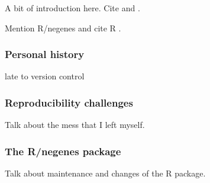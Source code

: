 A bit of introduction here. Cite \citet{lamichhane2003}
and \citet{blades2002}.

Mention R/negenes \citep{negenes} and cite R \citep{R}.

\subsubsection{Personal history}

late to version control

\subsubsection{Reproducibility challenges}

Talk about the mess that I left myself.

\subsubsection{The R/negenes package}

Talk about maintenance and changes of the R package.
